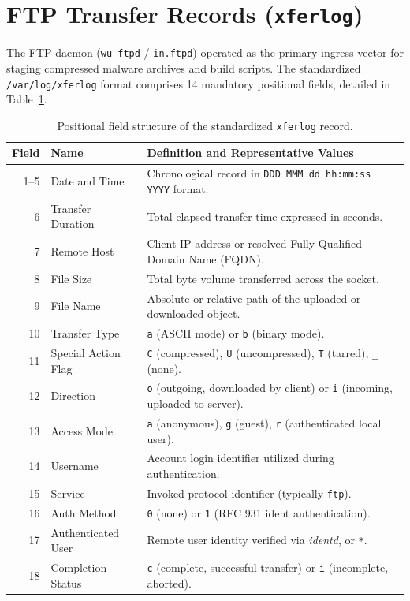 \section{FTP Transfer Records (\texttt{xferlog})}

The FTP daemon (\texttt{wu-ftpd} / \texttt{in.ftpd}) operated as the primary ingress vector for staging compressed malware archives and build scripts. The standardized \texttt{/var/log/xferlog} format comprises 14 mandatory positional fields, detailed in Table~\ref{tab:xferlog_estructura}.

\begin{table}[htbp]
\centering
\scriptsize
\begin{tabularx}{\textwidth}{@{} r l X @{}}
\toprule
\textbf{Field} & \textbf{Name} & \textbf{Definition and Representative Values} \\
\midrule
1--5 & Date and Time & Chronological record in \texttt{DDD MMM dd hh:mm:ss YYYY} format. \\
6 & Transfer Duration & Total elapsed transfer time expressed in seconds. \\
7 & Remote Host & Client IP address or resolved Fully Qualified Domain Name (FQDN). \\
8 & File Size & Total byte volume transferred across the socket. \\
9 & File Name & Absolute or relative path of the uploaded or downloaded object. \\
10 & Transfer Type & \texttt{a} (ASCII mode) or \texttt{b} (binary mode). \\
11 & Special Action Flag & \texttt{C} (compressed), \texttt{U} (uncompressed), \texttt{T} (tarred), \texttt{\_} (none). \\
12 & Direction & \texttt{o} (outgoing, downloaded by client) or \texttt{i} (incoming, uploaded to server). \\
13 & Access Mode & \texttt{a} (anonymous), \texttt{g} (guest), \texttt{r} (authenticated local user). \\
14 & Username & Account login identifier utilized during authentication. \\
15 & Service & Invoked protocol identifier (typically \texttt{ftp}). \\
16 & Auth Method & \texttt{0} (none) or \texttt{1} (RFC 931 ident authentication). \\
17 & Authenticated User & Remote user identity verified via \textit{identd}, or \texttt{*}. \\
18 & Completion Status & \texttt{c} (complete, successful transfer) or \texttt{i} (incomplete, aborted). \\
\bottomrule
\end{tabularx}
\caption{Positional field structure of the standardized \texttt{xferlog} record.}
\label{tab:xferlog_estructura}
\end{table}

